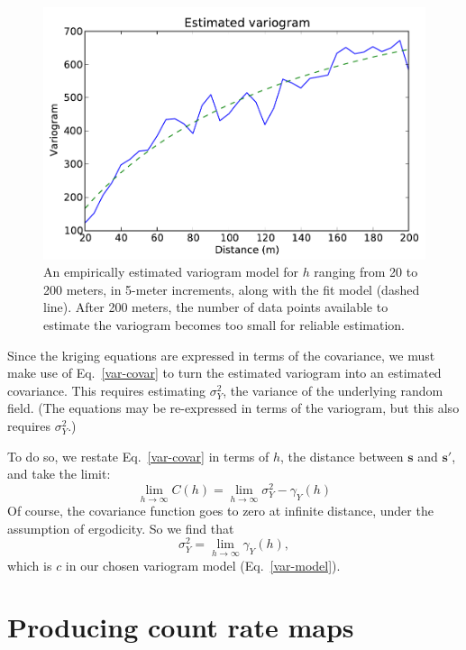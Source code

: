 \begin{figure}
  \centering
  \includegraphics[width=\textwidth]{figures/stadium-variogram.pdf}
  \caption{An empirically estimated variogram model for \(h\) ranging from 20 to
    200 meters, in 5-meter increments, along with the fit model (dashed
    line). After 200 meters, the number of data points available to estimate the
    variogram becomes too small for reliable estimation.}
  \label{stadium-variogram}
\end{figure}

Since the kriging equations are expressed in terms of the covariance, we must
make use of Eq.~\ref{var-covar} to turn the estimated variogram into an
estimated covariance. This requires estimating \(\sigma_Y^2\), the variance of
the underlying random field. (The equations may be re-expressed in terms of the
variogram, but this also requires \(\sigma_Y^2\).)

To do so, we restate Eq.~\ref{var-covar} in terms of \(h\), the distance between
\(\mathbf{s}\) and \(\mathbf{s'}\), and take the limit:
\begin{equation}
  \lim_{h\to\infty} C(h) = \lim_{h\to\infty} \sigma_Y^2 - \gamma_Y (h)
\end{equation}
Of course, the covariance function goes to zero at infinite distance, under the
assumption of ergodicity. So we find that
\begin{equation}
\sigma_Y^2 = \lim_{h\to\infty} \gamma_Y(h),
\end{equation}
which is \(c\) in our chosen variogram model (Eq.~\ref{var-model}).

\section{Producing count rate maps}

